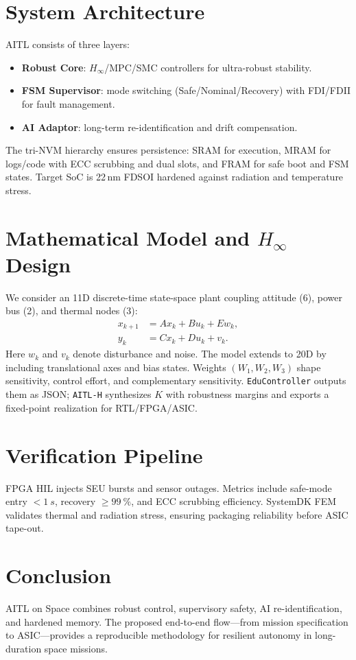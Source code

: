 \documentclass[conference]{IEEEtran}
\begin{document}
\section{System Architecture}
AITL consists of three layers:
\begin{itemize}
  \item \textbf{Robust Core}: $H_\infty$/MPC/SMC controllers for ultra-robust stability.
  \item \textbf{FSM Supervisor}: mode switching (Safe/Nominal/Recovery) with FDI/FDII for fault management.
  \item \textbf{AI Adaptor}: long-term re-identification and drift compensation.
\end{itemize}
The tri-NVM hierarchy ensures persistence: SRAM for execution, MRAM for logs/code with ECC scrubbing and dual slots, and FRAM for safe boot and FSM states. Target SoC is 22\,nm FD\!SOI hardened against radiation and temperature stress.

\section{Mathematical Model and \texorpdfstring{$H_\infty$}{H-infinity} Design}
We consider an 11D discrete-time state-space plant coupling attitude (6), power bus (2), and thermal nodes (3):
\begin{align}
  x_{k+1} &= A x_k + B u_k + E w_k, \label{eq:ss1}\\
  y_k &= C x_k + D u_k + v_k. \label{eq:ss2}
\end{align}
Here \(w_k\) and \(v_k\) denote disturbance and noise. The model extends to 20D by including translational axes and bias states. Weights \((W_1,W_2,W_3)\) shape sensitivity, control effort, and complementary sensitivity. \texttt{EduController} outputs them as JSON; \texttt{AITL-H} synthesizes \(K\) with robustness margins and exports a fixed-point realization for RTL/FPGA/ASIC.

\section{Verification Pipeline}
FPGA HIL injects SEU bursts and sensor outages. Metrics include safe-mode entry \(<\SI{1}{s}\), recovery \(\ge\SI{99}{\percent}\), and ECC scrubbing efficiency. SystemDK FEM validates thermal and radiation stress, ensuring packaging reliability before ASIC tape-out.

\section{Conclusion}
AITL on Space combines robust control, supervisory safety, AI re-identification, and hardened memory. The proposed end-to-end flow---from mission specification to ASIC---provides a reproducible methodology for resilient autonomy in long-duration space missions.
\end{document}
